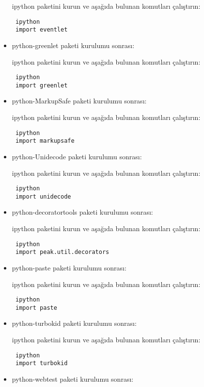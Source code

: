 \documentclass[a4paper,10pt]{article}
\begin{document}
\begin{itemize}
ipython paketini kurun ve aşağıda bulunan komutları çalıştırın:
\begin{verbatim}
 ipython
 import eventlet
\end{verbatim}

\item python-greenlet paketi kurulumu sonrası:

ipython paketini kurun ve aşağıda bulunan komutları çalıştırın:
\begin{verbatim}
 ipython
 import greenlet
\end{verbatim}

\item python-MarkupSafe paketi kurulumu sonrası:

ipython paketini kurun ve aşağıda bulunan komutları çalıştırın:
\begin{verbatim}
 ipython
 import markupsafe
\end{verbatim}

\item python-Unidecode paketi kurulumu sonrası:

ipython paketini kurun ve aşağıda bulunan komutları çalıştırın:
\begin{verbatim}
 ipython
 import unidecode
\end{verbatim}

\item python-decoratortools paketi kurulumu sonrası:

ipython paketini kurun ve aşağıda bulunan komutları çalıştırın:
\begin{verbatim}
 ipython
 import peak.util.decorators
\end{verbatim}

\item python-paste paketi kurulumu sonrası:

ipython paketini kurun ve aşağıda bulunan komutları çalıştırın:
\begin{verbatim}
 ipython
 import paste
\end{verbatim}

\item python-turbokid paketi kurulumu sonrası:

ipython paketini kurun ve aşağıda bulunan komutları çalıştırın:
\begin{verbatim}
 ipython
 import turbokid
\end{verbatim}

\item python-webtest paketi kurulumu sonrası:


\end{itemize}
\end{document}
